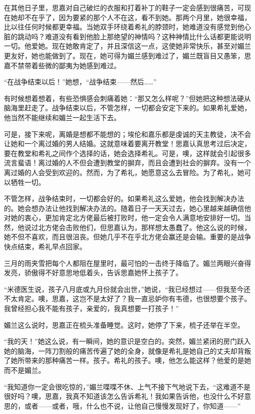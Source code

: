 \par 在其他日子里，思嘉对自己破烂的衣服和打着补丁的鞋子一定会感到很痛苦，可现在她却不在乎了，因为要紧的那个人不在这，看不到她。那两个月里，她很幸福，比以往任何时候都更幸福。当她双手环绕着希礼的脖颈时，她难道没有感觉到他心脏的跳动吗？难道没有看到他脸上那绝望的神情吗？这种神情比什么话都更能说明一切。他爱她。现在她敢肯定了，并且深信这一点，这使她非常快乐，甚至对媚兰更友好，她也能做到了。现在，她可得为媚兰感到难过了，媚兰既盲目又愚笨，思嘉不禁带着些微的鄙夷为她感到难过。
\par “在战争结束以后！”她想，“战争结束——然后……”
\par 有时候想着想着，有些恐惧感会刺痛着她：“那又怎么样呢？”但她把这种想法硬从脑海里赶走了。战争结束以后，不管怎样，一切都会安定下来的。如果希礼爱她，他当然不能继续和媚兰一起生活下去。
\par 可是，接下来呢，离婚是想都不能想的；埃伦和嘉乐都是虔诚的天主教徒，决不会让她和一个离过婚的男人结婚。这就意味着要离开教堂！思嘉认真思考过后决定，要在教堂和希礼之间作个选择的话，她会选择希礼。可是，噢，这样就会引起很多流言蜚语！离过婚的人不但会遭到教堂的摒弃，而且会遭到社会的摒弃。没有一个离过婚的人会受到欢迎的。然而，为了希礼，她愿意这么去冒险。为了希礼，她可以牺牲一切。
\par 不管怎样，战争结束时，一切都会好的。如果希礼这么爱她，他会找到解决办法的。她会想办法让他找到解决办法的。随着日子一天天过去，她心里越来越确信他对她的衷心，更加肯定北方佬最后被打败时，他一定会令人满意地安排好一切。当然，他说过北方佬会击败他们，但思嘉认为，那样想太愚蠢了。他这么说的时候，她不但不喜欢，而且很沮丧。但她几乎不在乎北方佬会赢还是会输。重要的是战争快点结束，希礼早点回家。
\par 三月的雨夹雪把每个人都阻在屋里时，最可怕的一击终于降临了。媚兰两眼兴奋得发亮，骄傲得不好意思地低着头，告诉思嘉她怀上孩子了。
\par “米德医生说，孩子八月底或九月份就会出世，”她说，“我已经想过——但我至今还不太肯定。噢，思嘉，这岂不是太好了？我一直忌妒你有韦德，也很想要个孩子。我曾经担心我不能有孩子，亲爱的，我真想要一打孩子！”
\par 媚兰这么说时，思嘉正在梳头准备睡觉。这时，她停了下来，梳子还举在半空。
\par “我的天！”她这么说，有一瞬间，她的意识是空白的。突然，媚兰紧闭的房门跃入她的脑海，一阵刀割般的痛苦传遍了她的全身，就像是希礼是她自己的丈夫却背叛了她所带来的那种痛苦一样。孩子。希礼的孩子。噢，他怎么能这样？他爱的是她而不是媚兰。
\par “我知道你一定会很吃惊的，”媚兰喋喋不休、上气不接下气地说下去，“这难道不是很好吗？噢，思嘉，我真不知道该怎么告诉希礼！我如果告诉他，也没什么不好意思的，或者——或者，哦，什么也不说，让他自己慢慢发现好了，你知道——”
